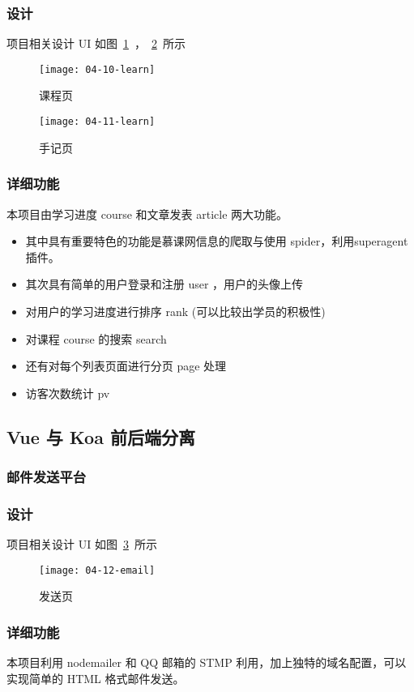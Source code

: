 \subsubsection*{设计}

项目相关设计 UI 如图~\ref{fig:04-10-learn}~，~\ref{fig:04-11-learn}~所示

\begin{figure}[htbp]
\centering
\texttt{[image: 04-10-learn]}
\caption{课程页}
\label{fig:04-10-learn}
\end{figure}

\begin{figure}[htbp]
\centering
\texttt{[image: 04-11-learn]}
\caption{手记页}
\label{fig:04-11-learn}
\end{figure}

\subsubsection*{详细功能}

本项目由学习进度 course 和文章发表 article 两大功能。
\begin{itemize}
  \item 其中具有重要特色的功能是慕课网信息的爬取与使用 spider，利用superagent插件。
  \item 其次具有简单的用户登录和注册 user ，用户的头像上传
  \item 对用户的学习进度进行排序 rank (可以比较出学员的积极性)
  \item 对课程 course 的搜索 search
  \item 还有对每个列表页面进行分页 page 处理
  \item 访客次数统计 pv
\end{itemize}

\subsection{Vue 与 Koa 前后端分离}
\label{sec:requirements}

\subsubsection{邮件发送平台}
\label{sec:requirements}

\subsubsection*{设计}

项目相关设计 UI 如图~\ref{fig:04-12-email}~所示

\begin{figure}[htbp]
\centering
\texttt{[image: 04-12-email]}
\caption{发送页}
\label{fig:04-12-email}
\end{figure}

\subsubsection*{详细功能}

本项目利用 nodemailer 和 QQ 邮箱的 STMP 利用，加上独特的域名配置，可以实现简单的 HTML 格式邮件发送。

